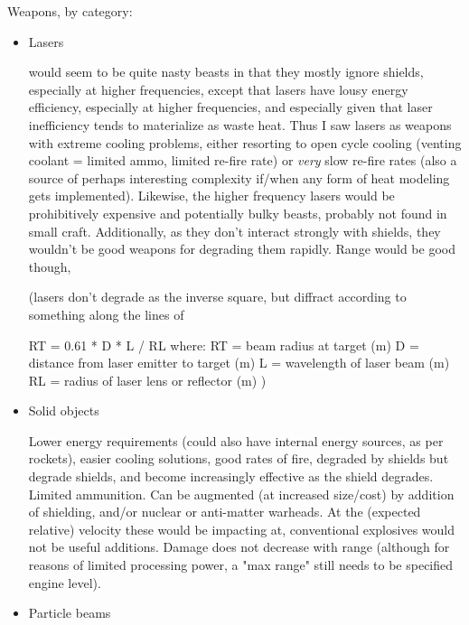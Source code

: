 Weapons, by category:
\begin{itemize}
\item Lasers

would seem to be quite nasty beasts in that they mostly ignore
shields, especially at higher frequencies, except that lasers have
lousy energy efficiency, especially at higher frequencies, and
especially given that laser inefficiency tends to materialize as waste
heat. Thus I saw lasers as weapons with extreme cooling problems,
either resorting to open cycle cooling (venting coolant = limited
ammo, limited re-fire rate) or {\em very} slow re-fire rates (also a source
of perhaps interesting complexity if/when any form of heat modeling
gets implemented). Likewise, the higher frequency lasers would be
prohibitively expensive and potentially bulky beasts, probably not
found in small craft. Additionally, as they don't interact strongly
with shields, they wouldn't be good weapons for degrading them
rapidly. Range would be good though,

(lasers don't degrade as the inverse square, but diffract according to something along the lines of 

RT = 0.61 * D * L / RL 
where: 
RT = beam radius at target (m) 
D = distance from laser emitter to target (m) 
L = wavelength of laser beam (m) 
RL = radius of laser lens or reflector (m) 
) 

\item Solid objects 

Lower energy requirements (could also have internal energy sources, as
per rockets), easier cooling solutions, good rates of fire, degraded
by shields but degrade shields, and become increasingly effective as
the shield degrades. Limited ammunition. Can be augmented (at
increased size/cost) by addition of shielding, and/or nuclear or
anti-matter warheads. At the (expected relative) velocity these would
be impacting at, conventional explosives would not be useful
additions. Damage does not decrease with range (although for reasons
of limited processing power, a "max range" still needs to be specified
engine level).

\item Particle beams


\end{itemize}
